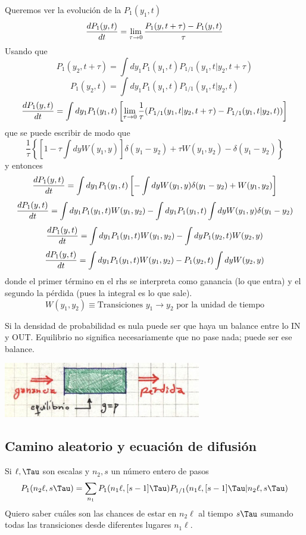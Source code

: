 \documentclass[10pt,oneside]{CBFT_book}
\begin{document}
Queremos ver la evolución de la $P_1(y_1,t)$
\[
	\frac{d^{\hspace{-0.05em}} {P_1(y,t)}}{d {t}^{\hspace{-0.05em}}} = \lim_{\tau \to 0} \frac{P_1(y,t+\tau) - P_1(y,t) }{\tau}
\]
Usando que
\[
	P_1(y_2,t+\tau) = \int dy_1 P_1(y_1,t) P_{1/1}(y_1,t|y_2,t+\tau) 
\]
\[
	P_1(y_2,t) = \int dy_1 P_1(y_1,t) P_{1/1}(y_1,t|y_2,t) 
\]
\[
	\frac{d^{\hspace{-0.05em}} {P_1(y,t)}}{d {t}^{\hspace{-0.05em}}} = \int dy_1 P_1(y_1,t) \left[ \lim_{\tau \to 0} 
	\frac{1}{\tau} (P_{1/1}(y_1,t|y_2,t+\tau) - P_{1/1}(y_1,t|y_2,t))   \right]
\]
que se puede escribir de modo que 
\[
	\frac{1}{\tau} \left\{ [ 1 - \tau \int dy W(y_1,y)]\delta(y_1 - y_2) + 
	\tau W(y_1,y_2) - \delta(y_1-y_2) \right\}
\]
y entonces 
\[
	\frac{d^{\hspace{-0.05em}} {P_1(y,t)}}{d {t}^{\hspace{-0.05em}}} = \int dy_1 P_1(y_1,t) 
	\left[ -\int dy W(y_1,y) \delta(y_1-y_2) + W(y_1,y_2) \right]
\]
\[
	\frac{d^{\hspace{-0.05em}} {P_1(y,t)}}{d {t}^{\hspace{-0.05em}}} = \int dy_1 P_1(y_1,t) W(y_1,y_2) - \int dy_1 P_1(y_1,t) \int dy W(y_1,y)\delta(y_1-y_2)
\]
\[
	\frac{d^{\hspace{-0.05em}} {P_1(y,t)}}{d {t}^{\hspace{-0.05em}}} = \int dy_1 P_1(y_1,t) W(y_1,y_2) - \int dy P_1(y_2,t) W(y_2,y)
\]
\[
	\frac{d^{\hspace{-0.05em}} {P_1(y,t)}}{d {t}^{\hspace{-0.05em}}} = \int dy_1 P_1(y_1,t) W(y_1,y_2) - P_1(y_2,t) \int dy  W(y_2,y)
\]
donde el primer término en el rhs se interpreta como ganancia (lo que entra) y el segundo la
pérdida (pues la integral es lo que sale).
\[
	W(y_1,y_2) \equiv \text{Transiciones $y_1\to y_2$ por la unidad de tiempo}
\]

Si la densidad de probabilidad es nula puede ser que haya un balance entre lo IN y OUT.
Equilibrio no significa necesariamente que no pase nada; puede ser ese balance.


\begin{center}
	\includegraphics[scale=0.5]{images/1606329165.jpg}
\end{center}


\subsection{Camino aleatorio y ecuación de difusión}

Si $\ell, \Tau$ son escalas y $n_2,s$ un número entero de pasos 
\[
	P_1(n_2\ell, s\Tau ) = 
	\sum_{n_1} P_1( n_1\ell, [s-1]\Tau )P_{1/1}( n_1\ell, [s-1]\Tau|n_2\ell, s\Tau )
\]
Quiero saber cuáles son las chances de estar en $n_2\ell$ al tiempo $s\Tau$ sumando todas 
las transiciones desde diferentes lugares $n_1\ell$.
\end{document}
